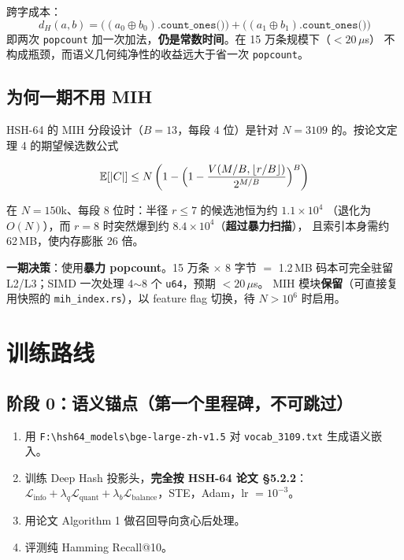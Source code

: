 \documentclass[11pt,a4paper]{ctexart}
\newcommand{\keybox}[1]{%
  \begin{center}\begin{minipage}{0.94\textwidth}%
  \colorbox{graylight}{\begin{minipage}{0.92\textwidth}\vspace{3pt}#1\vspace{3pt}\end{minipage}}%
  \end{minipage}\end{center}}
\theoremstyle{definition}
\begin{document}
跨字成本：
\begin{equation}
d_H(a,b)=\bigl((a_0\oplus b_0)\texttt{.count\_ones()}\bigr)+\bigl((a_1\oplus b_1)\texttt{.count\_ones()}\bigr)
\end{equation}
即两次 \texttt{popcount} 加一次加法，\textbf{仍是常数时间}。在 15 万条规模下（$<20\,\mu$s）
不构成瓶颈，而语义几何纯净性的收益远大于省一次 \texttt{popcount}。

\subsection{为何一期不用 MIH}

HSH-64 的 MIH 分段设计（$B=13$，每段 4 位）是针对 $N=3109$ 的。按论文定理 4 的期望候选数公式

\begin{equation}
\mathbb{E}[|C|]\le N\left(1-\Bigl(1-\frac{V(M/B,\lfloor r/B\rfloor)}{2^{M/B}}\Bigr)^{B}\right)
\end{equation}

在 $N=150$k、每段 8 位时：半径 $r\le 7$ 的候选池恒为约 $1.1\times10^4$
（退化为 $O(N)$），而 $r=8$ 时突然爆到约 $8.4\times10^4$（\textbf{超过暴力扫描}），
且索引本身需约 62\,MB，使内存膨胀 26 倍。

\keybox{%
\textbf{一期决策}：使用\textbf{暴力 popcount}。15 万条 $\times$ 8 字节 $=$ 1.2\,MB 码本可完全驻留
L2/L3；SIMD 一次处理 4$\sim$8 个 \texttt{u64}，预期 $<20\,\mu$s。
MIH 模块\textbf{保留}（可直接复用快照的 \texttt{mih\_index.rs}），以 feature flag 切换，待 $N>10^6$ 时启用。}

\section{训练路线}

\subsection{阶段 0：语义锚点（第一个里程碑，不可跳过）}

\begin{enumerate}
\item 用 \texttt{F:\textbackslash hsh64\_models\textbackslash bge-large-zh-v1.5} 对 \texttt{vocab\_3109.txt} 生成语义嵌入。
\item 训练 Deep Hash 投影头，\textbf{完全按 HSH-64 论文 §5.2.2}：
      $\mathcal{L}_{\text{info}}+\lambda_q\mathcal{L}_{\text{quant}}+\lambda_b\mathcal{L}_{\text{balance}}$，STE，Adam，lr $=10^{-3}$。
\item 用论文 Algorithm 1 做召回导向贪心后处理。
\item 评测纯 Hamming Recall@10。
\end{enumerate}
\end{document}
